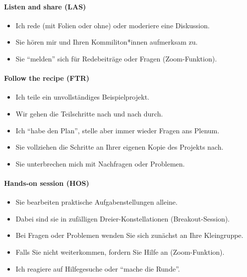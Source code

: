 \documentclass[11pt,german,a4paper]{article}
\providecommand{\tightlist}{%
  \setlength{\itemsep}{0pt}\setlength{\parskip}{0pt}}
\let\oldparagraph\paragraph
\renewcommand{\paragraph}[1]{\oldparagraph{#1}\mbox{}}
\begin{document}
\hypertarget{listen-and-share-las}{%
\paragraph{Listen and share (LAS)}\label{listen-and-share-las}}

\begin{itemize}
\tightlist
\item
  Ich rede (mit Folien oder ohne) oder moderiere eine Diskussion.
\item
  Sie hören mir und Ihren Kommiliton*innen aufmerksam zu.
\item
  Sie ``melden'' sich für Redebeiträge oder Fragen (Zoom-Funktion).
\end{itemize}

\hypertarget{follow-the-recipe-ftr}{%
\paragraph{Follow the recipe (FTR)}\label{follow-the-recipe-ftr}}

\begin{itemize}
\tightlist
\item
  Ich teile ein unvollständiges Beispielprojekt.
\item
  Wir gehen die Teilschritte nach und nach durch.
\item
  Ich ``habe den Plan'', stelle aber immer wieder Fragen ans Plenum.
\item
  Sie vollziehen die Schritte an Ihrer eigenen Kopie des Projekts nach.
\item
  Sie unterbrechen mich mit Nachfragen oder Problemen.
\end{itemize}

\hypertarget{hands-on-session-hos}{%
\paragraph{Hands-on session (HOS)}\label{hands-on-session-hos}}

\begin{itemize}
\tightlist
\item
  Sie bearbeiten praktische Aufgabenstellungen alleine.
\item
  Dabei sind sie in zufälligen Dreier-Konstellationen (Breakout-Session).
\item
  Bei Fragen oder Problemen wenden Sie sich zunächst an Ihre Kleingruppe.
\item
  Falls Sie nicht weiterkommen, fordern Sie Hilfe an (Zoom-Funktion).
\item
  Ich reagiere auf Hilfegesuche oder ``mache die Runde''.
\end{itemize}
\end{document}
